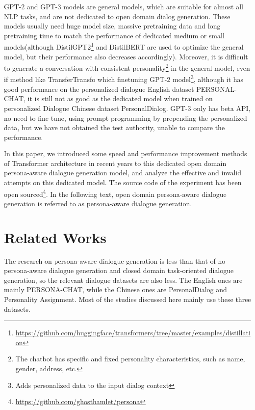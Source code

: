 \documentclass[letterpaper]{article} %
\DeclareRobustCommand{\citeext}[1]{\cite[#1]{#1}}
\begin{document}
GPT-2 and GPT-3 models are general models, which are suitable for almost all NLP tasks, and are not dedicated to open domain dialog generation. These models usually need huge model size, massive pretraining data and long pretraining time to match the performance of dedicated medium or small models(although DistilGPT2\footnote{\url{https://github.com/huggingface/transformers/tree/master/examples/distillation}} and DistilBERT\citeext{Sanh2019} are used to optimize the general model, but their performance also decreases accordingly). 
Moreover, it is difficult to generate a conversation with consistent personality\footnote{The chatbot has specific and fixed personality characteristics, such as name, gender, address, etc.} in the general model, even if method like TransferTransfo\citeext{Wolf2019} which finetuning GPT-2 model\footnote{Adds personalized data to the input dialog context}, although it has good performance on the personalized dialogue English dataset PERSONAL-CHAT\citeext{Zhang2018}, it is still not as good as the dedicated model\citeext{Zheng2019} when trained on personalized Dialogue Chinese dataset PersonalDialog\citeext{Zheng2019a}. GPT-3 only has beta API, no need to fine tune, using prompt programming by prepending the personalized data, but we have not obtained the test authority, unable to compare the performance. 

In this paper, we introduced some speed and performance improvement methods of Transformer architecture in recent years to this dedicated open domain persona-aware dialogue generation model\citeext{Zheng2019}, and analyze the effective and invalid attempts on this dedicated model. The source code of the experiment has been open sourced\footnote{\url{https://github.com/ghosthamlet/persona}}. In the following text, open domain persona-aware dialogue generation is referred to as persona-aware dialogue generation. 

\section[Related Works]{Related Works} 
The research on persona-aware dialogue generation is less than that of no persona-aware dialogue generation and closed domain task-oriented dialogue generation, so the relevant dialogue datasets are also less. The English ones are mainly PERSONA-CHAT\citeext{Zhang2018}, while the Chinese ones are PersonalDialog\citeext{Zheng2019a} and Personality Assignment\citeext{Qian2017}. Most of the studies discussed here mainly use these three datasets. 
\end{document}
